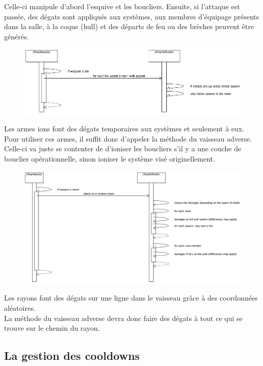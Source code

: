 		Celle-ci manipule d'abord l'esquive et les boucliers. Ensuite, si l'attaque est passée, des dégats sont appliqués aux systèmes, aux membres d'équipage présents dans la salle, à la coque (hull) et des départs de feu ou des brèches peuvent être générés. 
		\begin{figure}[H]
			\centering
			\includegraphics[width=1\linewidth]{smoothUseWeaponToAttackSequenceDiagramIon}
		\end{figure}
		Les armes ions font des dégats temporaires aux systèmes et seulement à eux.\\
		Pour utiliser ces armes, il suffit donc d'appeler la méthode du vaisseau adverse. Celle-ci va juste se contenter de d'ioniser les boucliers s'il y a une couche de bouclier opérationnelle, sinon ioniser le système visé originellement.
		\begin{figure}[H]
			\centering
			\includegraphics[width=1\linewidth]{smoothUseWeaponToAttackSequenceDiagramBeam}
		\end{figure}
		Les rayons font des dégats sur une ligne dans le vaisseau grâce à des coordonnées aléatoires.\\
		La méthode du vaisseau adverse devra donc faire des dégats à tout ce qui se trouve sur le chemin du rayon.

	\subsection{La gestion des cooldowns}

